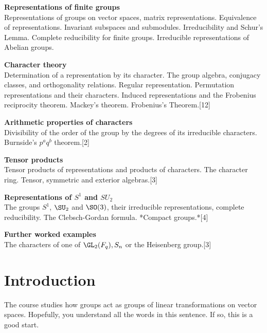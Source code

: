 \documentclass[a4paper]{article}
\begin{document}
\maketitle
{\small
\noindent\textbf{Representations of finite groups}\\
Representations of groups on vector spaces, matrix representations. Equivalence of representations. Invariant subspaces and submodules. Irreducibility and Schur's Lemma. Complete reducibility for finite groups. Irreducible representations of Abelian groups.

\vspace{10pt}
\noindent\textbf{Character theory}\\
Determination of a representation by its character. The group algebra, conjugacy classes, and orthogonality relations. Regular representation. Permutation representations and their characters. Induced representations and the Frobenius reciprocity theorem. Mackey's theorem. Frobenius's Theorem.\hspace*{\fill}[12]

\vspace{10pt}
\noindent\textbf{Arithmetic properties of characters}\\
Divisibility of the order of the group by the degrees of its irreducible characters. Burnside's $p^a q^b$ theorem.\hspace*{\fill}[2]

\vspace{10pt}
\noindent\textbf{Tensor products}\\
Tensor products of representations and products of characters. The character ring. Tensor, symmetric and exterior algebras.\hspace*{\fill}[3]

\vspace{10pt}
\noindent\textbf{Representations of $S^1$ and $SU_2$}\\
The groups $S^1$, $\SU_2$ and $\SO(3)$, their irreducible representations, complete reducibility. The Clebsch-Gordan formula. *Compact groups.*\hspace*{\fill}[4]

\vspace{10pt}
\noindent\textbf{Further worked examples}\\
The characters of one of $\GL_2(F_q), S_n$ or the Heisenberg group.\hspace*{\fill}[3]}

\tableofcontents
\setcounter{section}{-1}
\section{Introduction}
The course studies how groups act as groups of linear transformations on vector spaces. Hopefully, you understand all the words in this sentence. If so, this is a good start.
\end{document}
